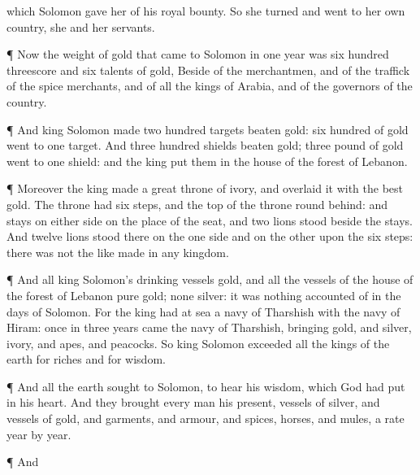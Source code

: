 {{} which
Solomon
gave her of his
royal
bounty. So she
turned and
went to her own
country, she and her
servants.
\par }{\PP {}¶ Now the
weight of
gold that
came to
Solomon in
one
year was
six
hundred
threescore and
six
talents of
gold,
Beside
{} of the
merchantmen, and of the
traffick of the spice
merchants, and of all the
kings of
Arabia, and of the
governors of the
country.
\par }{\PP {}¶ And
king
Solomon
made two
hundred
targets
{}
beaten
gold:
six
hundred
{} of
gold
went to
one
target.
And
{}
three
hundred
shields
{}
beaten
gold;
three
pound of
gold
went to
one
shield: and the
king
put them in the
house of the
forest of
Lebanon.
\par }{\PP {}¶ Moreover the
king
made a
great
throne of
ivory, and
overlaid it with the
best
gold.
The
throne had
six
steps, and the
top of the
throne
{}
round
behind: and
{}
stays on either side on the
place of the
seat, and
two
lions
stood
beside the
stays.
And
twelve
lions
stood there on the one side and on the other upon the
six
steps: there was not the
like
made in any
kingdom.
\par }{\PP {}¶ And all
king
Solomon’s
drinking
vessels
{}
gold, and all the
vessels of the
house of the
forest of
Lebanon
{}
pure
gold; none
{}
silver: it was
nothing
accounted of in the
days of
Solomon.
For the
king had at
sea a
navy of
Tharshish with the
navy of
Hiram:
once in
three
years
came the
navy of
Tharshish,
bringing
gold, and
silver,
ivory, and
apes, and
peacocks.
So
king
Solomon
exceeded all the
kings of the
earth for
riches and for
wisdom.
\par }{\PP {}¶ And all the
earth
sought
to
Solomon, to
hear his
wisdom, which
God had
put in his
heart.
And they
brought every
man his
present,
vessels of
silver, and
vessels of
gold, and
garments, and
armour, and
spices,
horses, and
mules, a
rate
year by
year.
\par }{\PP {}¶ And
}
